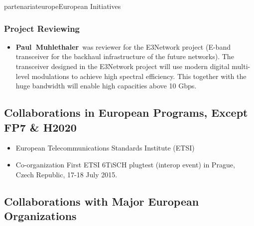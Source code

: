 \documentclass{ra2016}
\newcommand{\paul}             {\textbf{Paul~Muhlethaler}}
\begin{document}
\begin{module}{partenariat}{europe}{European Initiatives}
\subsubsection{Project Reviewing} 

\begin{itemize}
    \item \paul~was reviewer for the E3Network project  (E-band transceiver for the backhaul infrastructure of the future networks). The transceiver designed in the E3Network project will use modern digital multi-level modulations to achieve high spectral efficiency. This together with the huge bandwidth will enable high capacities above 10 Gbps.
\end{itemize}

\subsection{Collaborations in European Programs, Except FP7 \& H2020}

\begin{itemize}
    \item European Telecommunications Standards Institute (ETSI)
    \item Co-organization First ETSI 6TiSCH plugtest (interop event) in Prague, Czech Republic, 17-18 July 2015.
\end{itemize}


\subsection{Collaborations with Major European Organizations}


\end{module}
\end{document}
